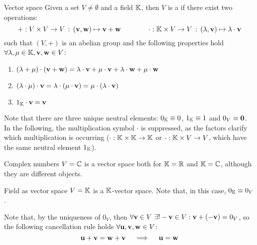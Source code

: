 \begin{definition}{Vector space}{}
  Given a set $ V \neq \emptyset $ and a field $ \mathbb{K} $, then $ V $ is a  if there exist two operations:
  \begin{equation*}
    + : V \times V \rightarrow V \,:\, (\mathbf{v} , \mathbf{w}) \mapsto \mathbf{v} + \mathbf{w}
    \qquad \qquad
    \cdot : \mathbb{K} \times V \rightarrow V \,:\, (\lambda , \mathbf{v}) \mapsto \lambda \cdot \mathbf{v}
  \end{equation*}
  such that $ (V,+) $ is an abelian group and the following properties hold $ \forall \lambda , \mu \in \mathbb{K} , \mathbf{v} , \mathbf{w} \in V $:
  \begin{enumerate}
    \item $ (\lambda + \mu) \cdot (\mathbf{v} + \mathbf{w}) = \lambda \cdot \mathbf{v} + \mu \cdot \mathbf{v} + \lambda \cdot \mathbf{w} + \mu \cdot \mathbf{w} $
    \item $ (\lambda \cdot \mu) \cdot \mathbf{v} = \lambda \cdot (\mu \cdot \mathbf{v}) = \mu \cdot (\lambda \cdot \mathbf{v}) $
    \item $ 1_{\mathbb{K}} \cdot \mathbf{v} = \mathbf{v} $
  \end{enumerate}
\end{definition}

Note that there are three unique neutral elements: $ 0_{\mathbb{K}} \equiv 0 $, $ 1_{\mathbb{K}} \equiv 1 $ and $ 0_V \equiv \mathbf{0} $.
In the following, the multiplication symbol $ \cdot $ is suppressed, as the factors clarify which multiplication is occurring ($ \cdot : \mathbb{K} \times \mathbb{K} \rightarrow \mathbb{K} $ or $ \cdot : \mathbb{K} \times V \rightarrow V $, which have the same neutral element $ 1_{\mathbb{K}} $).

\begin{example}{Complex numbers}{}
  $ V = \mathbb{C} $ is a vector space both for $ \mathbb{K} = \mathbb{R} $ and $ \mathbb{K} = \mathbb{C} $, although they are different objects.
\end{example}

\begin{example}{Field as vector space}{}
  $ V = \mathbb{K} $ is a $ \mathbb{K} $-vector space. Note that, in this case, $ 0_{\mathbb{K}} \equiv 0_V $.
\end{example}

Note that, by the uniqueness of $ 0_V $, then $ \forall \mathbf{v} \in V \,\,\exists! -\mathbf{v} \in V : \mathbf{v} + (-\mathbf{v}) = 0_V $, so the following cancellation rule holds $ \forall \mathbf{u} , \mathbf{v} , \mathbf{w} \in V $:
\begin{equation}
  \mathbf{u} + \mathbf{v} = \mathbf{w} + \mathbf{v}
  \quad \implies \quad
  \mathbf{u} = \mathbf{w}
  \label{eq:cancellation-rule}
\end{equation}

